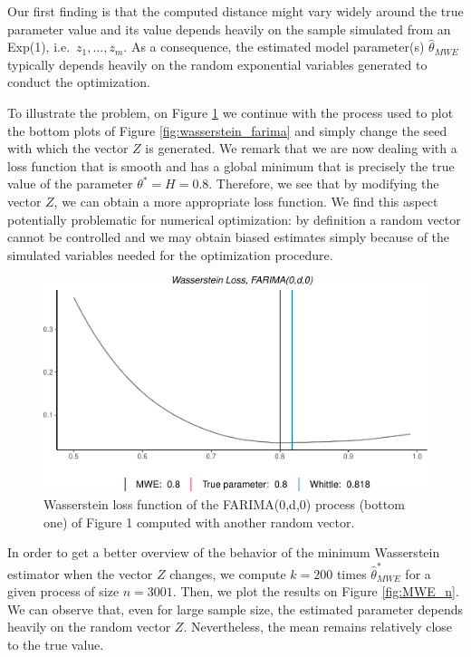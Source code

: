 \documentclass[
  11pt,
]{article}
\begin{document}
Our first finding is that the computed distance might vary widely around
the true parameter value and its value depends heavily on the sample
simulated from an Exp(1), i.e.~\(z_1, ..., z_m\). As a consequence, the
estimated model parameter(s) \(\hat \theta_{MWE}\) typically depends
heavily on the random exponential variables generated to conduct the
optimization.

To illustrate the problem, on Figure \ref{fig:wasserstein_z} we continue
with the process used to plot the bottom plots of Figure
\ref{fig:wasserstein_farima} and simply change the seed with which the
vector \(Z\) is generated. We remark that we are now dealing with a loss
function that is smooth and has a global minimum that is precisely the
true value of the parameter \(\theta^* = H = 0.8\). Therefore, we see
that by modifying the vector \(Z\), we can obtain a more appropriate
loss function. We find this aspect potentially problematic for numerical
optimization: by definition a random vector cannot be controlled and we
may obtain biased estimates simply because of the simulated variables
needed for the optimization procedure.

\begin{figure}[h]

{\centering \includegraphics[width=0.55\linewidth]{Master_thesis_V5_files/figure-latex/wasserstein_z-1} 

}

\caption{Wasserstein loss function of the FARIMA(0,d,0) process (bottom one) of Figure 1 computed with another random vector.}\label{fig:wasserstein_z}
\end{figure}

In order to get a better overview of the behavior of the minimum
Wasserstein estimator when the vector \(Z\) changes, we compute
\(k = 200\) times \(\hat \theta^*_{MWE}\) for a given process of size
\(n = 3001\). Then, we plot the results on Figure \ref{fig:MWE_n}. We
can observe that, even for large sample size, the estimated parameter
depends heavily on the random vector \(Z\). Nevertheless, the mean
remains relatively close to the true value.
\end{document}
